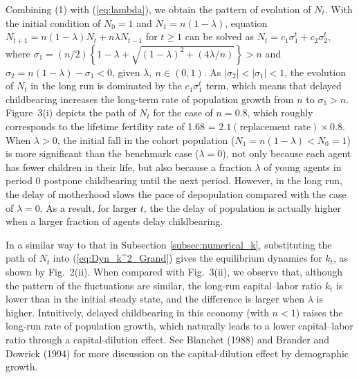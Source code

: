 \documentclass{MBE}%
\begin{document}
{Combining (1) with (\ref{eq:lambda}), we obtain the pattern of evolution of $N_{t}$. {With the
initial condition of $N_{0}=1$ and $N_{1}=n(1-\lambda)$, equation $N_{t+1}=n \left(  1-\lambda
\right)  N_{t}+n \lambda N_{t-1}$ for $t\geq1$ can be solved as $N_{t}=c_{1} \sigma_{1}^{t} +
c_{2} \sigma_{2}^{t}$, where $\sigma_{1}=(n/2)\left\{ 1-\lambda+
\sqrt{(1-\lambda)^{2}+(4\lambda/n)}\right\}  >n$ and $\sigma _{2}=n(1-\lambda)-\sigma_{1}<0$,
given $\lambda,\ n \in(0,1)$. As $|\sigma _{2}|<|\sigma_{1}|<1$, the evolution of $N_{t}$ in the
long run is dominated by the $c_{1} \sigma_{1}^{t}$ term, which means that delayed childbearing
increases the long-term rate of population growth from $n$ to $\sigma_{1}>n$. \label{fn:decline}}
Figure~3(i) depicts the path of $N_{t}$ for the case of $n=0.8$, which roughly corresponds to the
lifetime fertility rate of 1.68 = $2.1 (\text{replacement rate}) \times0.8$. When $\lambda>0$, the
initial fall in the cohort population ($N_{1}=n(1-\lambda)< N_{0} =1$) is more significant than
the benchmark case ($\lambda=0$), not only because each agent has fewer children in their life,
but also because a fraction $\lambda$ of young agents in period 0 postpone childbearing until the
next period. However, in the long run, the delay of motherhood slows the pace of depopulation
compared with the case of $\lambda=0$. As a result, for larger $t$, the the delay of  population
is actually higher when a larger fraction of agents delay childbearing.

In a similar way to that in Subsection \ref{subsec:numerical_k}, substituting the path of $N_{t}$
into (\ref{eq:Dyn_k^2_Grand}) gives the equilibrium dynamics for $k_{t}$, as shown by Fig.~2(ii).
When compared with Fig.~3(ii), we observe that, although the pattern of the fluctuations are
similar, the long-run capital--labor ratio $k_{t}$ is lower than in the initial steady state, and
the difference is larger when $\lambda$ is higher. Intuitively, delayed childbearing in this
economy (with $n<1$) raises the long-run rate of population growth, which naturally leads to a
lower capital--labor ratio through a capital-dilution effect. {See Blanchet (1988) and Brander and
Dowrick (1994) for more discussion on the capital-dilution effect by demographic growth.}


}
\end{document}
